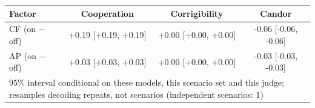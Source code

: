 \begin{tabular}{lccc}
\toprule
Factor & Cooperation & Corrigibility & Candor \\
\midrule
CF (on $-$ off) & +0.19 [+0.19, +0.19] & +0.00 [+0.00, +0.00] & -0.06 [-0.06, -0.06] \\
AP (on $-$ off) & +0.03 [+0.03, +0.03] & +0.00 [+0.00, +0.00] & -0.03 [-0.03, -0.03] \\
\midrule
\multicolumn{4}{l}{\footnotesize 95\% interval conditional on these models, this scenario set and this judge; resamples decoding repeats, not scenarios (independent scenarios: 1)} \\
\bottomrule
\end{tabular}
